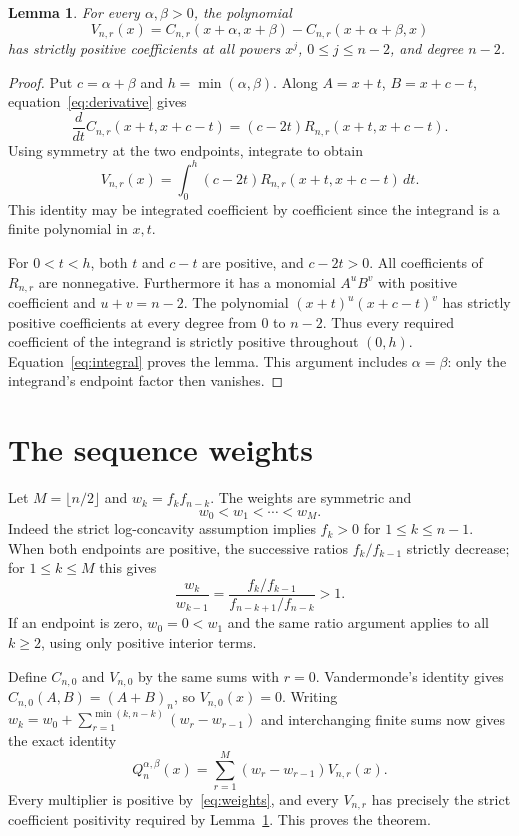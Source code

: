 \documentclass[10pt]{article}
\newtheorem{lemma}{Lemma}
\begin{document}
\begin{lemma}\label{lem:central}
For every $\alpha,\beta>0$, the polynomial
\[
 V_{n,r}(x)=C_{n,r}(x+\alpha,x+\beta)
            -C_{n,r}(x+\alpha+\beta,x)
\]
has strictly positive coefficients at all powers $x^j$,
$0\leq j\leq n-2$, and degree $n-2$.
\end{lemma}

\begin{proof}
Put $c=\alpha+\beta$ and $h=\min(\alpha,\beta)$.
Along $A=x+t$, $B=x+c-t$, equation~\eqref{eq:derivative} gives
\[
 \frac{d}{dt}C_{n,r}(x+t,x+c-t)
 =(c-2t)R_{n,r}(x+t,x+c-t).
\]
Using symmetry at the two endpoints, integrate to obtain
\begin{equation}
 V_{n,r}(x)=
 \int_0^h(c-2t)R_{n,r}(x+t,x+c-t)\,dt.
 \label{eq:integral}
\end{equation}
This identity may be integrated coefficient by coefficient since the
integrand is a finite polynomial in $x,t$.

For $0<t<h$, both $t$ and $c-t$ are positive, and $c-2t>0$.
All coefficients of $R_{n,r}$ are nonnegative. Furthermore it has a
monomial $A^uB^v$ with positive coefficient and $u+v=n-2$.
The polynomial $(x+t)^u(x+c-t)^v$ has strictly positive coefficients
at every degree from $0$ to $n-2$.
Thus every required coefficient of the integrand is strictly positive
throughout $(0,h)$. Equation~\eqref{eq:integral} proves the lemma.
This argument includes $\alpha=\beta$: only the integrand's endpoint
factor then vanishes.
\end{proof}

\section*{The sequence weights}

Let $M=\lfloor n/2\rfloor$ and $w_k=f_kf_{n-k}$.
The weights are symmetric and
\begin{equation}
 w_0<w_1<\cdots<w_M.
 \label{eq:weights}
\end{equation}
Indeed the strict log-concavity assumption implies $f_k>0$ for
$1\leq k\leq n-1$.
When both endpoints are positive, the successive ratios
$f_k/f_{k-1}$ strictly decrease; for $1\leq k\leq M$ this gives
\[
 \frac{w_k}{w_{k-1}}
 =\frac{f_k/f_{k-1}}{f_{n-k+1}/f_{n-k}}>1.
\]
If an endpoint is zero, $w_0=0<w_1$ and the same ratio argument applies
to all $k\geq2$, using only positive interior terms.

Define $C_{n,0}$ and $V_{n,0}$ by the same sums with $r=0$.
Vandermonde's identity gives $C_{n,0}(A,B)=(A+B)_n$, so
$V_{n,0}(x)=0$.
Writing
$w_k=w_0+\sum_{r=1}^{\min(k,n-k)}(w_r-w_{r-1})$
and interchanging finite sums now gives the exact identity
\begin{equation}
 Q_n^{\alpha,\beta}(x)
 =\sum_{r=1}^{M}(w_r-w_{r-1})V_{n,r}(x).
 \label{eq:decomposition}
\end{equation}
Every multiplier is positive by~\eqref{eq:weights}, and every
$V_{n,r}$ has precisely the strict coefficient positivity required
by Lemma~\ref{lem:central}. This proves the theorem.
\end{document}
